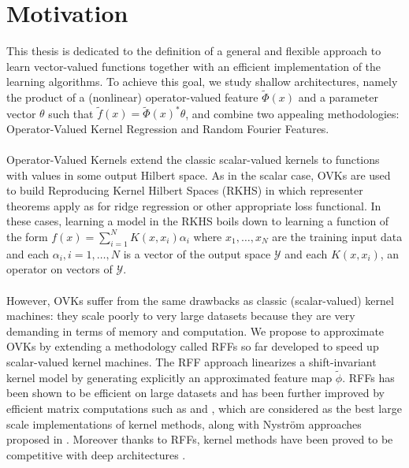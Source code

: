 \section{Motivation}
This thesis is dedicated to the definition of a general and flexible approach
to learn vector-valued functions together with an efficient implementation of the learning
algorithms. To achieve this goal, we study shallow architectures,
namely the product of a (nonlinear) operator-valued feature $\tilde{\Phi}(x)$
and a parameter vector $\theta$ such that $\tilde{f}(x) = \tilde{\Phi}(x)^*
\theta$, and combine two appealing methodologies: Operator-Valued Kernel
Regression and Random Fourier Features.
\paragraph{}
Operator-Valued Kernels \citep{Micchelli2005,Carmeli2010,Kadri_aistat10, Brouard2011,Alvarez2012} extend
the classic scalar-valued kernels to functions with values in some output Hilbert space. As in the scalar
case, \acfp{OVK} are used to build Reproducing Kernel
Hilbert Spaces (\acs{RKHS}) in which representer theorems apply as for ridge
regression or other appropriate loss functional. In these cases, learning a
model in the \acs{RKHS} boils down to learning a function of the form
$f(x)=\sum_{i=1}^N K(x,x_i)\alpha_i$ where $x_1, \ldots, x_N$ are the training
input data and each $\alpha_i, i=1, \ldots, N$ is a vector of the output space
$\mathcal{Y}$ and each $K(x,x_i)$, an operator on vectors of $\mathcal{Y}$.
\paragraph{}
However, \acsp{OVK} suffer from the same drawbacks as classic (scalar-valued)
kernel machines: they scale poorly to very large datasets because they are very
demanding in terms of memory and computation. We propose to approximate OVKs by
extending a methodology called \acfp{RFF} \citep{Rahimi2007, Le2013, Alacarte,
sriper2015, Bach2015, sutherland2015, rudi2016generalization} so far developed
to speed up scalar-valued kernel machines. The \acs{RFF} approach linearizes a
shift-invariant kernel model by generating explicitly an approximated feature
map $\tilde{\phi}$. \acsp{RFF} has been shown to be efficient on large datasets
and has been further improved by efficient matrix computations such as
\citep[``FastFood'']{Le2013} and \citep[``SORF'']{felix2016orthogonal}, which
are considered as the best large scale implementations of kernel methods, along
with Nystr\"om approaches proposed in \citet{drineas2005nystrom}. Moreover
thanks to \acsp{RFF}, kernel methods have been proved to be competitive with
deep architectures \citep{lu2014scale, dai2014scalable, yang2015deep}.

